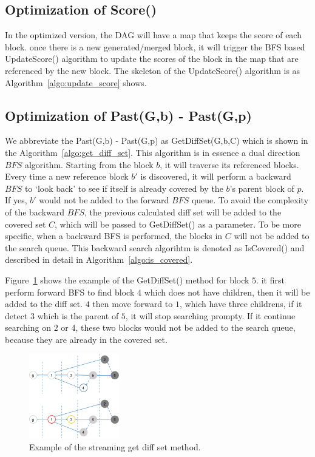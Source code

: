 \subsection{Optimization of Score()}
In the optimized version, the DAG will have a map that keeps the score of each block. once there is a new generated/merged block,
it will trigger the BFS based UpdateScore() algorithm to update the scores of the block in the map that are referenced by the new block.
The skeleton of the UpdateScore() algorithm is as Algorithm~\ref{algo:update_score} shows.



\subsection{Optimization of Past(G,b) - Past(G,p)}

We abbreviate the Past(G,b) - Past(G,p) as GetDiffSet(G,b,C) which is shown in the Algorithm~\ref{algo:get_diff_set}.
This algorithm is in essence a dual direction $BFS$ algorithm. Starting from the block $b$, it will traverse its referenced blocks.
Every time a new reference block $b'$ is discovered, it will perform a backward $BFS$ to `look back' to see if itself is already covered by the $b$'s parent block of $p$. 
If yes, $b'$ would not be added to the forward $BFS$ queue.  
To avoid the complexity of the backward $BFS$, the previous calculated diff set will be added to the covered set $C$, which will be passed to GetDiffSet() as a parameter.
To be more specific, when a backward BFS is performed, the blocks in $C$ will not be added to the search queue.
This backward search algorihtm is denoted as IsCovered() and described in detail in Algorithm~\ref{algo:is_covered}.

Figure~\ref{get_diff} shows the example of the GetDiffSet() method for block $5$.
it first perform forward BFS to find block $4$ which does not have children, then it will be added to the diff set.
$4$ then move forward to $1$, which have three childrens, if it detect $3$ which is the parent of $5$, it will stop searching prompty.
If it continue searching on $2$ or $4$, these two blocks would not be added to the search queue, because they are already in the covered set.





\begin{figure}[!ht]
\begin{center}
\includegraphics[width=0.35\textwidth]{figures/get_diff.pdf}
    \caption{
        Example of the streaming get diff set method.
     }
\label{get_diff}
\end{center}
\end{figure}

